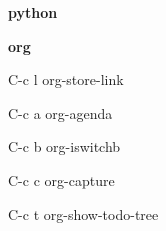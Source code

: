 \documentclass[10pt]{article}
\renewcommand\subsection[1]{\smallskip\par\textbf{\color{heading}#1}}
\begin{document}
\begin{multicols}{4}

  \subsection{python}
  \begin{keylist}
  \end{keylist}

  \subsection{org}
  \begin{keylist}
  \item[C-c l] org-store-link
  \item[C-c a] org-agenda
  \item[C-c b] org-iswitchb
  \item[C-c c] org-capture
  \item[C-c t] org-show-todo-tree
  \end{keylist}

\end{multicols}
\end{document}
